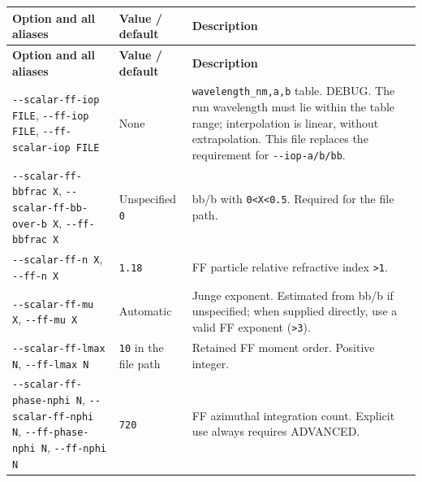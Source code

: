 {\TableFont
\begin{longtable}{@{}>{\raggedright\arraybackslash}p{}>{\raggedright\arraybackslash}p{}>{\raggedright\arraybackslash}p{}@{}}
\toprule
\textbf{Option and all aliases} & \textbf{Value / default} & \textbf{Description} \\
\midrule
\endfirsthead
\toprule
\textbf{Option and all aliases} & \textbf{Value / default} & \textbf{Description} \\
\midrule
\endhead
\bottomrule
\endfoot
\texttt{-\allowbreak{}-\allowbreak{}scalar-\allowbreak{}ff-\allowbreak{}iop FILE}, \texttt{-\allowbreak{}-\allowbreak{}ff-\allowbreak{}iop FILE}, \texttt{-\allowbreak{}-\allowbreak{}ff-\allowbreak{}scalar-\allowbreak{}iop FILE} & None & \texttt{wavelength\_\allowbreak{}nm,\allowbreak{}a,\allowbreak{}b} table. DEBUG. The run wavelength must lie within the table range; interpolation is linear, without extrapolation. This file replaces the requirement for \texttt{-\allowbreak{}-\allowbreak{}iop-\allowbreak{}a/\allowbreak{}b/\allowbreak{}bb}. \\
\texttt{-\allowbreak{}-\allowbreak{}scalar-\allowbreak{}ff-\allowbreak{}bbfrac X}, \texttt{-\allowbreak{}-\allowbreak{}scalar-\allowbreak{}ff-\allowbreak{}bb-\allowbreak{}over-\allowbreak{}b X}, \texttt{-\allowbreak{}-\allowbreak{}ff-\allowbreak{}bbfrac X} & Unspecified \texttt{0} & bb/b with \texttt{0<X<0.\allowbreak{}5}. Required for the file path. \\
\texttt{-\allowbreak{}-\allowbreak{}scalar-\allowbreak{}ff-\allowbreak{}n X}, \texttt{-\allowbreak{}-\allowbreak{}ff-\allowbreak{}n X} & \texttt{1.\allowbreak{}18} & FF particle relative refractive index \texttt{>1}. \\
\texttt{-\allowbreak{}-\allowbreak{}scalar-\allowbreak{}ff-\allowbreak{}mu X}, \texttt{-\allowbreak{}-\allowbreak{}ff-\allowbreak{}mu X} & Automatic & Junge exponent. Estimated from bb/b if unspecified; when supplied directly, use a valid FF exponent (\texttt{>3}). \\
\texttt{-\allowbreak{}-\allowbreak{}scalar-\allowbreak{}ff-\allowbreak{}lmax N}, \texttt{-\allowbreak{}-\allowbreak{}ff-\allowbreak{}lmax N} & \texttt{10} in the file path & Retained FF moment order. Positive integer. \\
\texttt{-\allowbreak{}-\allowbreak{}scalar-\allowbreak{}ff-\allowbreak{}phase-\allowbreak{}nphi N}, \texttt{-\allowbreak{}-\allowbreak{}scalar-\allowbreak{}ff-\allowbreak{}nphi N}, \texttt{-\allowbreak{}-\allowbreak{}ff-\allowbreak{}phase-\allowbreak{}nphi N}, \texttt{-\allowbreak{}-\allowbreak{}ff-\allowbreak{}nphi N} & \texttt{720} & FF azimuthal integration count. Explicit use always requires ADVANCED. \\
\end{longtable}
}

